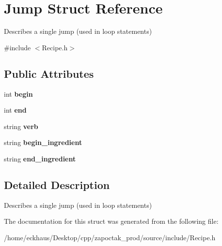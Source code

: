 \hypertarget{structJump}{\section{Jump Struct Reference}
\label{structJump}
}


Describes a single jump (used in loop statements)  




{\ttfamily \#include $<$Recipe.\-h$>$}

\subsection*{Public Attributes}
\begin{DoxyCompactItemize}
\item 
\hypertarget{structJump_aacc2efa25696a52f6f61f62267ab2f47}{int {\bfseries begin}}\label{structJump_aacc2efa25696a52f6f61f62267ab2f47}

\item 
\hypertarget{structJump_aa71cf756358c686638ffc89fa770d479}{int {\bfseries end}}\label{structJump_aa71cf756358c686638ffc89fa770d479}

\item 
\hypertarget{structJump_a17951d7947d33ea44e3bc961098721b6}{string {\bfseries verb}}\label{structJump_a17951d7947d33ea44e3bc961098721b6}

\item 
\hypertarget{structJump_a3a86e53486aa1fd1e53ce1e4419b72b0}{string {\bfseries begin\-\_\-ingredient}}\label{structJump_a3a86e53486aa1fd1e53ce1e4419b72b0}

\item 
\hypertarget{structJump_afbc8174b322f14a877dd6f276d078bb1}{string {\bfseries end\-\_\-ingredient}}\label{structJump_afbc8174b322f14a877dd6f276d078bb1}

\end{DoxyCompactItemize}


\subsection{Detailed Description}
Describes a single jump (used in loop statements) 

The documentation for this struct was generated from the following file\-:\begin{DoxyCompactItemize}
\item 
/home/eckhaus/\-Desktop/cpp/zapoctak\-\_\-prod/source/include/Recipe.\-h\end{DoxyCompactItemize}
